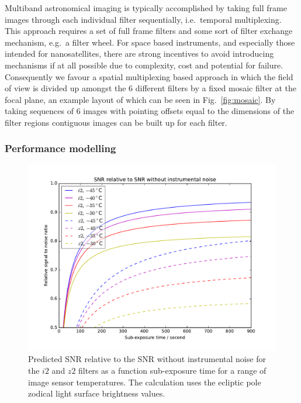 \documentclass[]{iac}
\begin{document}
Multiband astronomical imaging is typically accomplished by taking full frame images through each individual filter
sequentially, i.e.\ temporal multiplexing. This approach requires a set of full frame filters and some sort of filter
exchange mechanism, e.g.\ a filter wheel. For space based instruments, and especially those intended for nanosatellites,
there are strong incentives to avoid introducing mechanisms if at all possible due to complexity, cost and potential for
failure. Consequently we favour a spatial multiplexing based approach in which the field of view is divided up amongst
the 6 different filters by a fixed mosaic filter at the focal plane, an example layout of which can be seen in
Fig.~\ref{fig:mosaic}. By taking sequences of 6 images with pointing offsets equal to the dimensions of the filter
regions contiguous images can be built up for each filter.

\subsubsection{Performance modelling} \label{sec:perf}

\begin{figure}[tp]
  \center \includegraphics[width=\columnwidth]{figures/relsnr.pdf}
  \caption{\label{fig:relsnr}Predicted SNR relative to the SNR without instrumental noise for the $i2$ and $z2$ filters
    as a function sub-exposure time for a range of image sensor temperatures. The calculation uses the ecliptic pole
    zodical light surface brightness values.}
\end{figure}
\end{document}
